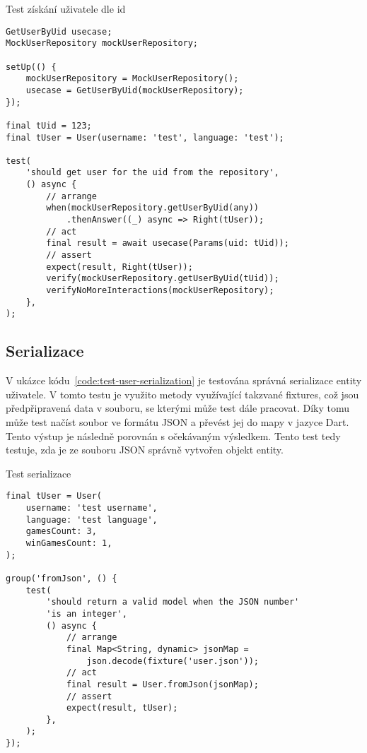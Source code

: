 \begin{listing}
    \caption{Test získání uživatele dle id}
    \label{code:test-get-user}
    \begin{verbatim}
GetUserByUid usecase;
MockUserRepository mockUserRepository;

setUp(() {
    mockUserRepository = MockUserRepository();
    usecase = GetUserByUid(mockUserRepository);
});

final tUid = 123;
final tUser = User(username: 'test', language: 'test');

test(
    'should get user for the uid from the repository',
    () async {
        // arrange
        when(mockUserRepository.getUserByUid(any))
            .thenAnswer((_) async => Right(tUser));
        // act
        final result = await usecase(Params(uid: tUid));
        // assert
        expect(result, Right(tUser));
        verify(mockUserRepository.getUserByUid(tUid));
        verifyNoMoreInteractions(mockUserRepository);
    },
);
    \end{verbatim}
\end{listing}

\subsection{Serializace}

V ukázce kódu~\ref{code:test-user-serialization} je testována správná
serializace entity uživatele.
V tomto testu je využito metody využívající takzvané fixtures,
což jsou předpřipravená data v souboru,
se kterými může test dále pracovat.
Díky tomu může test načíst soubor ve formátu JSON a převést jej do mapy v jazyce
Dart.
Tento výstup je následně porovnán s očekávaným výsledkem.
Tento test tedy testuje,
zda je ze souboru JSON správně vytvořen objekt entity.

\begin{listing}
    \caption{Test serializace}
    \label{code:test-user-serialization}
    \begin{verbatim}
final tUser = User(
    username: 'test username',
    language: 'test language',
    gamesCount: 3,
    winGamesCount: 1,
);

group('fromJson', () {
    test(
        'should return a valid model when the JSON number'
        'is an integer',
        () async {
            // arrange
            final Map<String, dynamic> jsonMap =
                json.decode(fixture('user.json'));
            // act
            final result = User.fromJson(jsonMap);
            // assert
            expect(result, tUser);
        },
    );
});
    \end{verbatim}
\end{listing}

